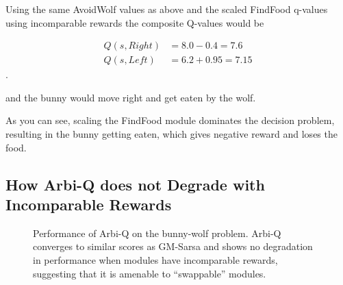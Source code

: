 Using the same AvoidWolf values as above and the scaled FindFood q-values using incomparable rewards the composite Q-values would be

\begin{align*}
  Q(s, Right) &= 8.0 - 0.4 = 7.6\\
  Q(s, Left) &= 6.2 + 0.95 = 7.15
\end{align*}.

and the bunny would move right and get eaten by the wolf.

As you can see, scaling the FindFood module dominates the decision problem, resulting in the bunny getting eaten, which gives negative reward and loses the food.

\subsection{How Arbi-Q does not Degrade with Incomparable Rewards}

\begin{figure}[ht]
  \begin{center}
    \caption{Performance of Arbi-Q on the bunny-wolf problem. Arbi-Q converges to similar scores as GM-Sarsa and shows no degradation in performance when modules have incomparable rewards, suggesting that it is amenable to ``swappable'' modules.}
  \end{center}
  \label{fig:arbiq--results}
\end{figure}


